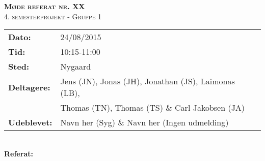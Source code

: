 
\newcommand{\HRule}{\rule{\linewidth}{0.1mm}}


	\begin{center}
		{\huge \bfseries \textsc{Møde referat nr. XX}}\\
		\textsc{\large 4. semesterprojekt - Gruppe 1}\\[0.3cm]
	\end{center}
	\begin{tabular}{ll}
	\large \textbf{Dato:} & 24/08/2015  \\ %
	\large \textbf{Tid:}  & 10:15-11:00 \\ %
	\large \textbf{Sted:} & Nygaard		\\ %
	\large \textbf{Deltagere:} & Jens (JN), Jonas (JH), Jonathan (JS), Laimonas (LB), \\
	\large \textbf & Thomas (TN),  Thomas (TS) \& Carl Jakobsen (JA)\\
	\large \textbf{Udeblevet:} & Navn her (Syg) \& Navn her (Ingen udmelding)	\\
	\end{tabular}\\
	\phantom{\,}\hspace{0.1em} \large \textbf{Referat:}
